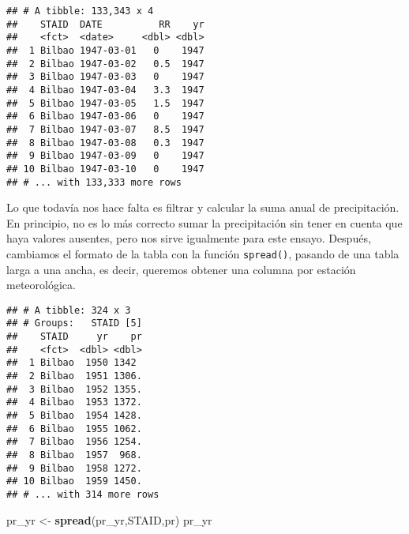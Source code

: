 \documentclass[]{article}
\newenvironment{Shaded}{\begin{snugshade}}{\end{snugshade}}
\newcommand{\KeywordTok}[1]{\textcolor[rgb]{0.13,0.29,0.53}{\textbf{#1}}}
\newcommand{\DataTypeTok}[1]{\textcolor[rgb]{0.13,0.29,0.53}{#1}}
\newcommand{\StringTok}[1]{\textcolor[rgb]{0.31,0.60,0.02}{#1}}
\newcommand{\OtherTok}[1]{\textcolor[rgb]{0.56,0.35,0.01}{#1}}
\newcommand{\OperatorTok}[1]{\textcolor[rgb]{0.81,0.36,0.00}{\textbf{#1}}}
\newcommand{\NormalTok}[1]{#1}
\begin{document}
\begin{verbatim}
## # A tibble: 133,343 x 4
##    STAID  DATE          RR    yr
##    <fct>  <date>     <dbl> <dbl>
##  1 Bilbao 1947-03-01   0    1947
##  2 Bilbao 1947-03-02   0.5  1947
##  3 Bilbao 1947-03-03   0    1947
##  4 Bilbao 1947-03-04   3.3  1947
##  5 Bilbao 1947-03-05   1.5  1947
##  6 Bilbao 1947-03-06   0    1947
##  7 Bilbao 1947-03-07   8.5  1947
##  8 Bilbao 1947-03-08   0.3  1947
##  9 Bilbao 1947-03-09   0    1947
## 10 Bilbao 1947-03-10   0    1947
## # ... with 133,333 more rows
\end{verbatim}

Lo que todavía nos hace falta es filtrar y calcular la suma anual de
precipitación. En principio, no es lo más correcto sumar la
precipitación sin tener en cuenta que haya valores ausentes, pero nos
sirve igualmente para este ensayo. Después, cambiamos el formato de la
tabla con la función \texttt{spread()}, pasando de una tabla larga a una
ancha, es decir, queremos obtener una columna por estación
meteorológica.

\begin{Shaded}
\end{Shaded}

\begin{verbatim}
## # A tibble: 324 x 3
## # Groups:   STAID [5]
##    STAID     yr    pr
##    <fct>  <dbl> <dbl>
##  1 Bilbao  1950 1342 
##  2 Bilbao  1951 1306.
##  3 Bilbao  1952 1355.
##  4 Bilbao  1953 1372.
##  5 Bilbao  1954 1428.
##  6 Bilbao  1955 1062.
##  7 Bilbao  1956 1254.
##  8 Bilbao  1957  968.
##  9 Bilbao  1958 1272.
## 10 Bilbao  1959 1450.
## # ... with 314 more rows
\end{verbatim}

\begin{Shaded}
\begin{Highlighting}[]
\NormalTok{pr_yr <-}\StringTok{ }\KeywordTok{spread}\NormalTok{(pr_yr,STAID,pr)}
\NormalTok{pr_yr}
\end{Highlighting}
\end{Shaded}
\end{document}
